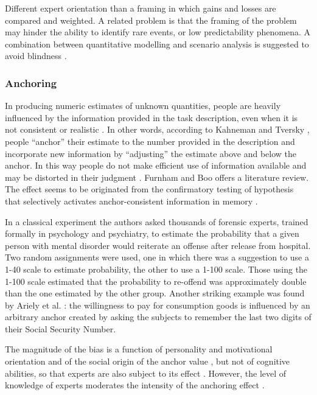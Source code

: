 \documentclass[b5paper,]{book}
\theoremstyle{definition}
\theoremstyle{definition}
\theoremstyle{definition}
\theoremstyle{remark}
\begin{document}
Different expert orientation than a framing in which gains and losses
are compared and weighted. A related problem is that the framing of the
problem may hinder the ability to identify rare events, or low
predictability phenomena. A combination between quantitative modelling
and scenario analysis is suggested to avoid blindness
\citep{makridakis2009forecasting}.

\subsubsection*{Anchoring}\label{anchoring}

In producing numeric estimates of unknown quantities, people are heavily
influenced by the information provided in the task description, even
when it is not consistent or realistic \citep{gigerenzer2015calculated}.
In other words, according to Kahneman and Tversky
\citep{tversky1974judgment}, people ``anchor'' their estimate to the
number provided in the description and incorporate new information by
``adjusting'' the estimate above and below the anchor. In this way
people do not make efficient use of information available and may be
distorted in their judgment \citep{thorsteinson2008anchoring}. Furnham
and Boo \citep{furnham2011literature} offers a literature review. The
effect seems to be originated from the confirmatory testing of
hypothesis that selectively activates anchor-consistent information in
memory \citep{block1991overconfidence, chapman1999anchoring}.

In a classical experiment \citep{slovic2000violence} the authors asked
thousands of forensic experts, trained formally in psychology and
psychiatry, to estimate the probability that a given person with mental
disorder would reiterate an offense after release from hospital. Two
random assignments were used, one in which there was a suggestion to use
a 1-40 scale to estimate probability, the other to use a 1-100 scale.
Those using the 1-100 scale estimated that the probability to re-offend
was approximately double than the one estimated by the other group.
Another striking example was found by Ariely et al.
\citep{ariely2003coherent}: the willingness to pay for consumption goods
is influenced by an arbitrary anchor created by asking the subjects to
remember the last two digits of their Social Security Number.

The magnitude of the bias is a function of personality and motivational
orientation \citep{eroglu2010biases} and of the social origin of the
anchor value \citep{meub2015anchoring}, but not of cognitive abilities,
so that experts are also subject to its effect
\citep{mussweiler2000numeric, oechssler2009cognitive, bergman2010anchoring}.
However, the level of knowledge of experts moderates the intensity of
the anchoring effect \citep{wilson1996new, smith2013knowledge}.
\end{document}
